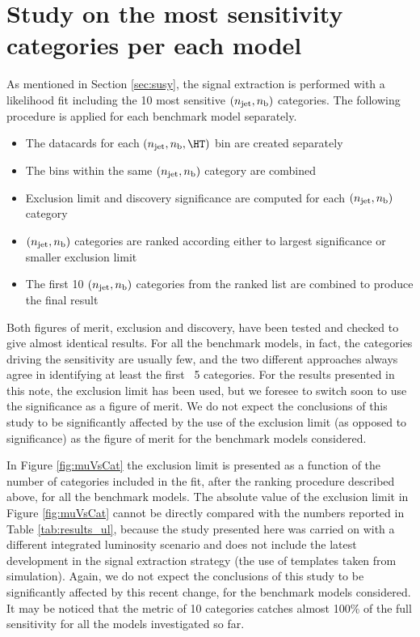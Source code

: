 \section{Study on the most sensitivity categories per each model}
\label{sec:sensitivity-study}
As mentioned in Section \ref{sec:susy}, the signal extraction is performed with a likelihood fit including the 
10 most sensitive $(n_{\text{jet}},n_{\text{b}})$ categories. 
The following procedure is applied for each benchmark model separately.

\begin{itemize}
\item The datacards for each $(\njet,\nb,\HT)$ bin are created separately
\item The \HT bins within the same $(n_{\text{jet}},n_{\text{b}})$ category are combined
\item Exclusion limit and discovery significance are computed for each $(n_{\text{jet}},n_{\text{b}})$ category
\item $(n_{\text{jet}},n_{\text{b}})$ categories are ranked according either to largest significance or smaller exclusion limit
\item The first 10 $(n_{\text{jet}},n_{\text{b}})$ categories from the ranked list are combined to produce the final result
\end{itemize}

Both figures of merit, exclusion and discovery, have been tested and checked to give almost identical results. 
For all the benchmark models, in fact, the categories driving the sensitivity are usually few, 
and the two different approaches always agree in identifying at least the first ~5 categories. 
For the results presented in this note, the exclusion limit has been used, but we foresee to switch soon 
to use the significance as a figure of merit. 
We do not expect the conclusions of this study to be significantly
affected by the use of the exclusion limit (as opposed to
significance) as the figure of merit for the benchmark models
considered.

In Figure \ref{fig:muVsCat} the exclusion limit is presented as a function of the number of categories 
included in the fit, after the ranking procedure described above, for all the benchmark models. 
The absolute value of the exclusion limit in Figure \ref{fig:muVsCat} cannot be directly compared with the numbers reported in Table \ref{tab:results_ul}, 
because the study presented here was carried on with a different
integrated luminosity scenario and does not include the latest
development in the signal extraction strategy 
(\ie the use of \mht templates taken from simulation). Again, we do
not expect the conclusions of this study to be significantly affected
by this recent change, for the benchmark models considered. 
It may be noticed that the metric of 10 categories catches almost 100\% of the full sensitivity 
for all the models investigated so far.

